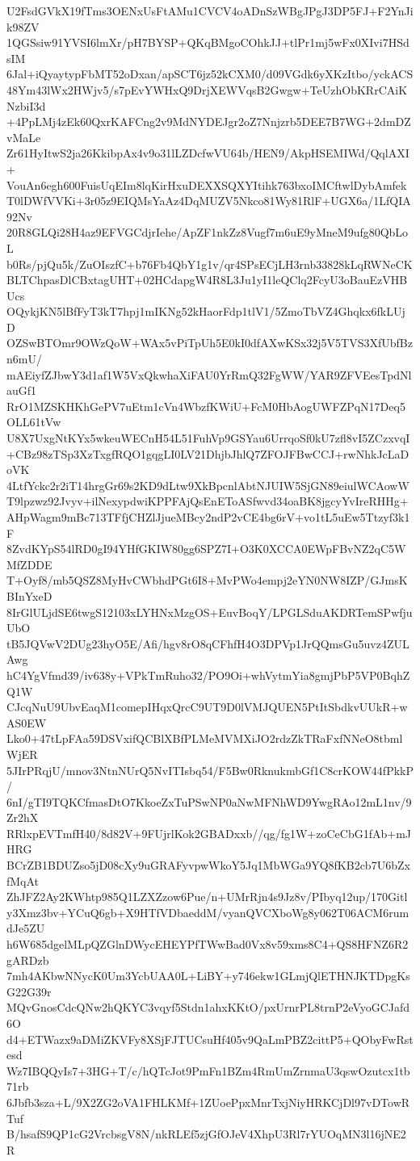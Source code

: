 U2FsdGVkX19fTms3OENxUsFtAMu1CVCV4oADnSzWBgJPgJ3DP5FJ+F2YnJik98ZV
1QGSsiw91YVSI6lmXr/pH7BYSP+QKqBMgoCOhkJJ+tlPr1mj5wFx0XIvi7HSdsIM
6Jal+iQyaytypFbMT52oDxan/apSCT6jz52kCXM0/d09VGdk6yXKzItbo/yckACS
48Ym43lWx2HWjv5/s7pEvYWHxQ9DrjXEWVqsB2Gwgw+TeUzhObKRrCAiKNzbiI3d
+4PpLMj4zEk60QxrKAFCng2v9MdNYDEJgr2oZ7Nnjzrb5DEE7B7WG+2dmDZvMaLe
Zr61HyItwS2ja26KkibpAx4v9o31lLZDcfwVU64b/HEN9/AkpHSEMIWd/QqlAXI+
VouAn6egh600FuisUqEIm8lqKirHxuDEXXSQXYItihk763bxoIMCftwlDybAmfek
T0lDWfVVKi+3r05z9EIQMsYaAz4DqMUZV5Nkco81Wy81RlF+UGX6a/1LfQIA92Nv
20R8GLQi28H4az9EFVGCdjrIehe/ApZF1nkZz8Vugf7m6uE9yMneM9ufg80QbLoL
b0Rs/pjQu5k/ZuOIszfC+b76Fb4QbY1g1v/qr4SPsECjLH3rnb33828kLqRWNeCK
BLTChpasDlCBxtagUHT+02HCdapgW4R8L3Ju1yI1leQClq2FcyU3oBauEzVHBUcs
OQykjKN5lBfFyT3kT7hpj1mIKNg52kHaorFdp1tlV1/5ZmoTbVZ4Ghqkx6fkLUjD
OZSwBTOmr9OWzQoW+WAx5vPiTpUh5E0kI0dfAXwKSx32j5V5TVS3XfUbfBzn6mU/
mAEiyfZJbwY3d1af1W5VxQkwhaXiFAU0YrRmQ32FgWW/YAR9ZFVEesTpdNlauGf1
RrO1MZSKHKhGePV7uEtm1cVn4WbzfKWiU+FcM0HbAogUWFZPqN17Deq5OLL61tVw
U8X7UxgNtKYx5wkeuWECnH54L51FuhVp9GSYau6UrrqoSf0kU7zfl8vI5ZCzxvqI
+CBz98zTSp3XzTxgfRQO1gqgLI0LV21DhjbJhlQ7ZFOJFBwCCJ+rwNhkJcLaDoVK
4LtfYckc2r2iT14hrgGr69s2KD9dLtw9XkBpcnlAbtNJUIW5SjGN89eiulWCAowW
T9lpzwz92Jvyv+ilNexypdwiKPPFAjQsEnEToASfwvd34oaBK8jgcyYvIreRHHg+
AHpWagm9mBc713TFfjCHZlJjueMBcy2ndP2vCE4bg6rV+vo1tL5uEw5Ttzyf3k1F
8ZvdKYpS54lRD0gI94YHfGKIW80gg6SPZ7I+O3K0XCCA0EWpFBvNZ2qC5WMfZDDE
T+Oyf8/mb5QSZ8MyHvCWbhdPGt6I8+MvPWo4empj2eYN0NW8IZP/GJmsKBInYxeD
8IrGlULjdSE6twgS12103xLYHNxMzgOS+EuvBoqY/LPGLSduAKDRTemSPwfjuUbO
tB5JQVwV2DUg23hyO5E/Afi/hgv8rO8qCFhfH4O3DPVp1JrQQmsGu5uvz4ZULAwg
hC4YgVfmd39/iv638y+VPkTmRuho32/PO9Oi+whVytmYia8gmjPbP5VP0BqhZQ1W
CJcqNuU9UbvEaqM1comepIHqxQrcC9UT9D0lVMJQUEN5PtItSbdkvUUkR+wAS0EW
Lko0+47tLpFAa59DSVxifQCBlXBfPLMeMVMXiJO2rdzZkTRaFxfNNeO8tbmlWjER
5JIrPRqjU/mnov3NtnNUrQ5NvITIsbq54/F5Bw0RknukmbGf1C8crKOW44fPkkP/
6nI/gTI9TQKCfmasDtO7KkoeZxTuPSwNP0aNwMFNhWD9YwgRAo12mL1nv/9Zr2hX
RRlxpEVTmfH40/8d82V+9FUjrlKok2GBADxxb//qg/fg1W+zoCeCbG1fAb+mJHRG
BCrZB1BDUZso5jD08cXy9uGRAFyvpwWkoY5Jq1MbWGa9YQ8fKB2cb7U6bZxfMqAt
ZhJFZ2Ay2KWhtp985Q1LZXZzow6Pue/n+UMrRjn4s9Jz8v/PIbyq12up/170Gitl
y3Xmz3bv+YCuQ6gb+X9HTfVDbaeddM/vyanQVCXboWg8y062T06ACM6rumdJe5ZU
h6W685dgelMLpQZGlnDWycEHEYPfTWwBad0Vx8v59xms8C4+QS8HFNZ6R2gARDzb
7mh4AKbwNNycK0Um3YcbUAA0L+LiBY+y746ekw1GLmjQlETHNJKTDpgKsG22G39r
MQvGnosCdcQNw2hQKYC3vqyf5Stdn1ahxKKtO/pxUrnrPL8trnP2eVyoGCJafd6O
d4+ETWazx9aDMiZKVFy8XSjFJTUCsuHf405v9QaLmPBZ2cittP5+QObyFwRstesd
Wz7IBQQyIs7+3HG+T/c/hQTcJot9PmFn1BZm4RmUmZrnmaU3qswOzutcx1tb71rb
6Jbfb3sza+L/9X2ZG2oVA1FHLKMf+1ZUoePpxMnrTxjNiyHRKCjDl97vDTowRTuf
B/hsafS9QP1cG2VrcbsgV8N/nkRLEf5zjGfOJeV4XhpU3Rl7rYUOqMN3l16jNE2R
